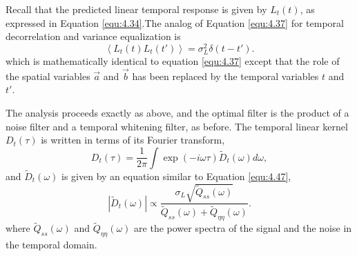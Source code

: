\begin{thm}
  Recall that the predicted
linear temporal response is given by $L_t(t)$, as expressed in
Equation \ref{equ:4.34}.The analog of Equation \ref{equ:4.37} for
temporal decorrelation and variance equalization is
\begin{equation}
  \label{equ:4.48}
  \left\langle L_{t}(t)L_{t}(t') \right\rangle = \sigma_{L}^{2}\delta(t-t').
\end{equation}
which is mathematically identical to equation \ref{equ:4.37} except that the role of
the spatial variables $\vec{a}$ and $\vec{b}$ has been replaced by
the temporal variables $t$ and $t'$.
\end{thm}

\begin{thm}
  The analysis proceeds exactly as above, and the optimal filter is
the product of a noise filter and a temporal whitening filter, as before. The
temporal linear kernel $D_t(\tau)$ is written in terms of its Fourier
transform,
\begin{equation}
  \label{equ:4.49}
  D_{t}(\tau) = \frac{1}{2\pi}\int \exp(-i\omega\tau)\tilde{D}_{t}(\omega)d\omega,
\end{equation}
and $\tilde{D}_t(\omega)$ is given by an equation similar to Equation
\ref{equ:4.47},
\begin{equation}
  \label{equ:4.50}
  \left| \tilde{D}_{t}(\omega) \right| \propto \frac{\sigma_{L}\sqrt{\tilde{Q}_{ss}(\omega)}}{\tilde{Q}_{ss}(\omega) + \tilde{Q}_{\eta\eta}(\omega)}.
\end{equation}
where $\tilde{Q}_{ss}(\omega)$ and $\tilde{Q}_{\eta\eta}(\omega)$ are
the power spectra of the signal and the noise in the temporal domain. 
\end{thm}


